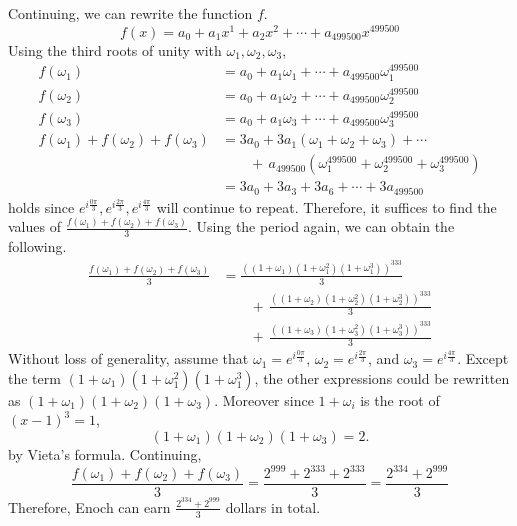 \documentclass[../../../main.tex]{subfiles}
\begin{document}
\begin{solution}
Continuing, we can rewrite the function $f$.
\[
f(x) = a_0 + a_1x^1 + a_2x^2 + \cdots + a_{499500}x^{499500}
\]
Using the third roots of unity with $\omega_1, \omega_2, \omega_3$,
\begin{align*}
    f(\omega_1)
    &= a_0 + a_1\omega_1 + \cdots + a_{499500}\omega_1^{499500} \\
    f(\omega_2)
    &= a_0 + a_1\omega_2 + \cdots + a_{499500}\omega_2^{499500} \\
    f(\omega_3)
    &= a_0 + a_1\omega_3 + \cdots + a_{499500}\omega_3^{499500}
    \\[0.5em]
    f(\omega_1) + f(\omega_2) + f(\omega_3)
    &= 3a_0 + 3a_1(\omega_1 + \omega_2 + \omega_3) + \cdots \\
    &\qquad + \, a_{499500} \left(
        \omega_1^{499500} + \omega_2^{499500} + \omega_3^{499500}
    \right) \\
    &= 3a_0 + 3a_3 + 3a_6 + \cdots + 3a_{499500}
\end{align*}
holds since $e^{ i \frac{0\pi}{3} }, e^{ i \frac{2\pi}{3} },
e^{ i \frac{4\pi}{3} }$ will continue to repeat. Therefore, it
suffices to find the values of $\frac{f(\omega_1) + f(\omega_2) +
f(\omega_3)}{3}$. Using the period again, we can obtain the following.
\begin{align*}
    \frac{ f(\omega_1) + f(\omega_2) + f(\omega_3) }{3}
    &= \frac{ \left(
        \left( 1 + \omega_1 \right)
        \left( 1 + \omega_1^2 \right)
        \left( 1 + \omega_1^3 \right)
    \right)^{333}}{3} \\
    &\qquad +\, \frac{ \left(
        \left( 1 + \omega_2 \right)
        \left( 1 + \omega_2^2 \right)
        \left( 1 + \omega_2^3 \right)
    \right)^{333}}{3} \\
    &\qquad +\, \frac{ \left(
        \left( 1 + \omega_3 \right)
        \left( 1 + \omega_3^2 \right)
        \left( 1 + \omega_3^3 \right)
    \right)^{333}}{3}
\end{align*}
Without loss of generality, assume that $\omega_1 =
e^{ i \frac{0\pi}{3} }$, $\omega_2 = e^{ i \frac{2\pi}{3} }$, and
$\omega_3 = e^{ i \frac{4\pi}{3} }$. Except the term
$\left( 1 + \omega_1 \right) \left( 1 + \omega_1^2 \right)
\left( 1 + \omega_1^3 \right)$, the other expressions
could be rewritten as $(1 + \omega_1)(1 + \omega_2)(1 + \omega_3)$.
Moreover since $1 + \omega_i$ is the root of $(x - 1)^3 = 1$,
\[
(1 + \omega_1)(1 + \omega_2)(1 + \omega_3) = 2.
\]
by Vieta's formula. Continuing,
\[
\frac{f(\omega_1) + f(\omega_2) + f(\omega_3)}{3}
= \frac{2^{999} + 2^{333} + 2^{333}}{3}
= \frac{2^{334} + 2^{999}}{3}
\]
Therefore, Enoch can earn $\frac{2^{334} + 2^{999}}{3}$ dollars in
total.
\end{solution}
\end{document}
